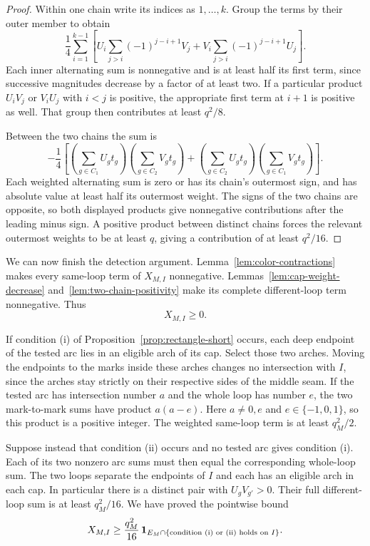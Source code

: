 \begin{proof}
Within one chain write its indices as $1,\ldots,k$.  Group the terms
by their outer member to obtain
\[
 \frac14\sum_{i=1}^{k-1}
 \left[
 U_i\sum_{j>i}(-1)^{j-i+1}V_j+
 V_i\sum_{j>i}(-1)^{j-i+1}U_j
 \right].
\]
Each inner alternating sum is nonnegative and is at least half its
first term, since successive magnitudes decrease by a factor of at
least two.  If a particular product $U_iV_j$ or $V_iU_j$ with $i<j$ is
positive, the appropriate first term at $i+1$ is positive as well.
That group then contributes at least $q^2/8$.

Between the two chains the sum is
\[
 -\frac14\left[
 \left(\sum_{g\in C_1}U_gt_g\right)
 \left(\sum_{g\in C_2}V_gt_g\right)
 +
 \left(\sum_{g\in C_2}U_gt_g\right)
 \left(\sum_{g\in C_1}V_gt_g\right)
 \right].
\]
Each weighted alternating sum is zero or has its chain's outermost sign, and has
absolute value at least half its outermost weight.  The signs of the
two chains are opposite, so both displayed products give nonnegative
contributions after the leading minus sign.  A positive product
between distinct chains forces the relevant outermost weights to be
at least $q$, giving a contribution of at least $q^2/16$.
\end{proof}

We can now finish the detection argument.  Lemma~\ref{lem:color-contractions}
makes every same-loop term of $X_{M,I}$ nonnegative.
Lemmas~\ref{lem:cap-weight-decrease} and~\ref{lem:two-chain-positivity}
make its complete different-loop term nonnegative.  Thus
\begin{equation}
 X_{M,I}\ge0.
 \label{eq:positive-observable}
\end{equation}

If condition (i) of Proposition~\ref{prop:rectangle-short} occurs, each
deep endpoint of the tested arc lies in an eligible arch of its cap.
Select those two arches.  Moving the endpoints to the marks inside
these arches changes no intersection with $I$, since the arches stay
strictly on their respective sides of the middle seam.  If the tested
arc has intersection number $a$ and the whole loop has number $e$,
the two mark-to-mark sums have product $a(a-e)$.  Here $a\ne0,e$ and
$e\in\{-1,0,1\}$, so this product is a positive integer.  The weighted
same-loop term is at least $q_M^2/2$.

Suppose instead that condition (ii) occurs and no tested arc gives
condition (i).  Each of its two nonzero arc sums must then equal the
corresponding whole-loop sum.  The two loops separate the endpoints
of $I$ and each has an eligible arch in each cap.  In particular there
is a distinct pair with $U_gV_{g'}>0$.  Their full different-loop sum
is at least $q_M^2/16$.  We have proved the pointwise bound
\begin{equation}
 X_{M,I}\ge\frac{q_M^2}{16}\,
 \mathbf 1_{E_M\cap\{\textnormal{condition (i) or (ii) holds on }I\}}.
 \label{eq:pointwise-detection}
\end{equation}

